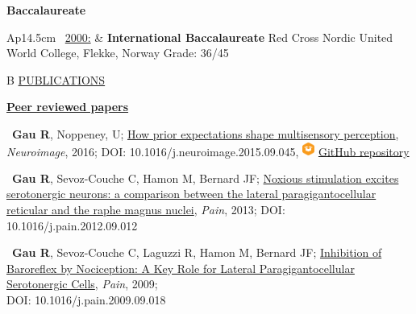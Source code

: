 \documentclass[a4paper,12pt,oneside]{letter}
\begin{document}
{\begin{center}
 \large\textbf{Baccalaureate}
\end{center}

\begin{tabular}{Ap{14.5cm}}
\textbullet~\underline{2000:} & \large\textbf{International Baccalaureate} \newline
				\normalsize Red Cross Nordic United World College, Flekke, Norway \newline
				Grade: 36/45 \\
\end{tabular}


\medskip 

\begin{tabular}{B}
 \underline{PUBLICATIONS}
\end{tabular}


\begin{center}
  \href{https://osf.io/4h63t/}{\large\textbf{Peer reviewed papers}}
\end{center}

\textbullet~\textbf{Gau R}, Noppeney, U; 
\href{http://www.sciencedirect.com/science/article/pii/S1053811915008605}{How prior expectations shape multisensory perception}, \textit{Neuroimage}, 2016; DOI: 10.1016/j.neuroimage.2015.09.045, \includegraphics[width=0.4cm]{materials_small_color.png} \href{https://github.com/Remi-Gau/McGurk_prior_code}{GitHub repository}

\textbullet~\textbf{Gau R}, Sevoz-Couche C, Hamon M, Bernard JF; 
\href{http://www.researchgate.net/profile/Remi_Gau/publication/233394350_Noxious_stimulation_excites_serotonergic_neurons_A_comparison_between_the_lateral_paragigantocellular_reticular_and_the_raphe_magnus_nuclei/links/586bf62508aebf17d3a5b232.pdf}{Noxious stimulation excites serotonergic neurons: a comparison between the lateral paragigantocellular reticular and the raphe magnus nuclei}, \textit{Pain}, 2013; DOI: 10.1016/j.pain.2012.09.012

\textbullet~\textbf{Gau R}, Sevoz-Couche C, Laguzzi R, Hamon M, Bernard JF; \href{http://www.researchgate.net/profile/Remi_Gau/publication/38057329_Inhibition_of_cardiac_baroreflex_by_noxious_thermal_stimuli_A_key_role_for_lateral_paragigantocellular_serotonergic_cells/links/586bf90d08ae8fce4919e188.pdf}{Inhibition of Baroreflex by Nociception: A Key Role for Lateral Paragigantocellular Serotonergic Cells}, \textit{Pain}, 2009; \\DOI: 10.1016/j.pain.2009.09.018

}
\end{document}
